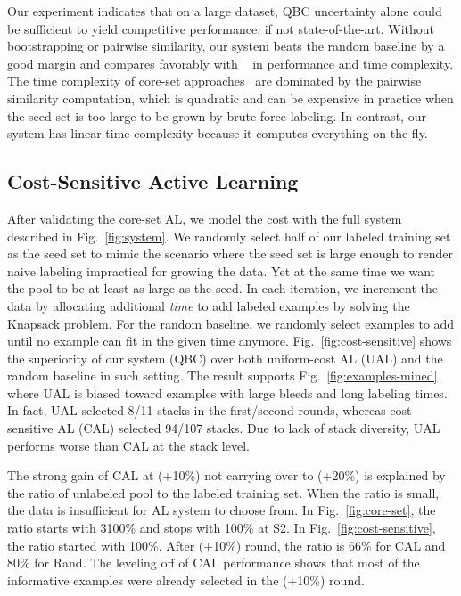 \documentclass{llncs}
\begin{document}
Our experiment indicates that on a large dataset, QBC uncertainty alone could be sufficient to yield competitive performance, if not state-of-the-art. Without bootstrapping or pairwise similarity, our system beats the random baseline by a good margin and compares favorably with ~\cite{yang2017suggestive} in performance and time complexity. The time complexity of core-set approaches~\cite{yang2017suggestive,sener2018active} are dominated by the pairwise similarity computation, which is quadratic and can be expensive in practice when the seed set is too large to be grown by brute-force labeling. In contrast, our system has linear time complexity because it computes everything on-the-fly.


\subsection{Cost-Sensitive Active Learning}
\vspace*{-0.05cm}

After validating the core-set AL, we model the cost with the full system described in Fig.~\ref{fig:system}. We randomly select half of our labeled training set as the seed set to mimic the scenario where the seed set is large enough to render naive labeling impractical for growing the data. Yet at the same time we want the pool to be at least as large as the seed. In each iteration, we increment the data by allocating additional \textit{time} to add labeled examples by solving the Knapsack problem. For the random baseline, we randomly select examples to add until no example can fit in the given time anymore. Fig.~\ref{fig:cost-sensitive} shows the superiority of our system (QBC) over both uniform-cost AL (UAL) and the random baseline in such setting. The result supports Fig.~\ref{fig:examples-mined} where UAL is biased toward examples with large bleeds and long labeling times. In fact, UAL selected 8/11 stacks in the first/second rounds, whereas cost-sensitive AL (CAL) selected 94/107 stacks. Due to lack of stack diversity, UAL performs worse than CAL at the stack level. 

The strong gain of CAL at (+10\%) not carrying over to (+20\%) is explained by the ratio of unlabeled pool to the labeled training set. When the ratio is small, the data is insufficient for AL system to choose from. In Fig.~\ref{fig:core-set}, the ratio starts with 3100\% and stops with 100\% at S2. In Fig.~\ref{fig:cost-sensitive}, the ratio started with 100\%. After (+10\%) round, the ratio is 66\% for CAL and 80\% for Rand. The leveling off of CAL performance shows that most of the informative examples were already selected in the (+10\%) round. 
\end{document}
